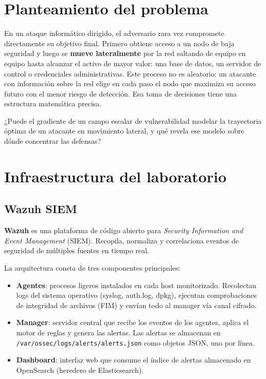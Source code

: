 \documentclass[12pt,a4paper]{article}
\begin{document}
\newpage
\tableofcontents
\newpage

\section{Planteamiento del problema}

En un ataque informático dirigido, el adversario rara vez compromete
directamente su objetivo final. Primero obtiene acceso a un nodo de
baja seguridad y luego se \textbf{mueve lateralmente} por la red
saltando de equipo en equipo hasta alcanzar el activo de mayor valor:
una base de datos, un servidor de control o credenciales administrativas.
Este proceso no es aleatorio: un atacante con información sobre la red
elige en cada paso el nodo que maximiza su acceso futuro con el menor
riesgo de detección. Esa toma de decisiones tiene una estructura
matemática precisa.

\begin{tcolorbox}[defbox, title=Pregunta central del proyecto]
  ¿Puede el gradiente de un campo escalar de vulnerabilidad modelar
  la trayectoria óptima de un atacante en movimiento lateral, y qué
  revela ese modelo sobre dónde concentrar las defensas?
\end{tcolorbox}

\section{Infraestructura del laboratorio}

\subsection{Wazuh SIEM}

\textbf{Wazuh} es una plataforma de código abierto para \emph{Security
Information and Event Management} (SIEM). Recopila, normaliza y
correlaciona eventos de seguridad de múltiples fuentes en tiempo real.

\medskip
La arquitectura consta de tres componentes principales:

\begin{itemize}
  \item \textbf{Agentes}: procesos ligeros instalados en cada host
    monitorizado. Recolectan logs del sistema operativo (syslog, auth.log,
    dpkg), ejecutan comprobaciones de integridad de archivos (FIM) y envían
    todo al manager vía canal cifrado.
  \item \textbf{Manager}: servidor central que recibe los eventos de los
    agentes, aplica el motor de reglas y genera las alertas. Las alertas
    se almacenan en \texttt{/var/ossec/logs/alerts/alerts.json} como
    objetos JSON, uno por línea.
  \item \textbf{Dashboard}: interfaz web que consume el índice de alertas
    almacenado en OpenSearch (heredero de Elasticsearch).
\end{itemize}
\end{document}
